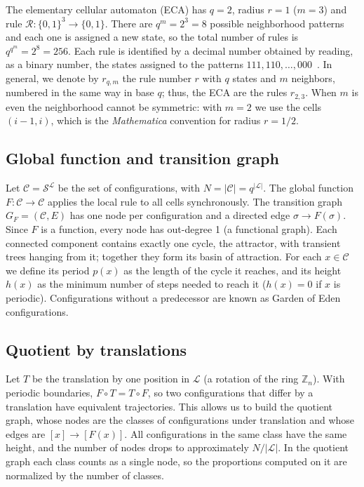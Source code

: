The elementary cellular automaton (ECA) has $q = 2$, radius $r = 1$ ($m = 3$) and rule $\mathcal{R} : \{0,1\}^3 \to \{0,1\}$. There are $q^{m} = 2^3 = 8$ possible neighborhood patterns and each one is assigned a new state, so the total number of rules is $q^{q^{m}} = 2^8 = 256$. Each rule is identified by a decimal number obtained by reading, as a binary number, the states assigned to the patterns $111, 110, \dots, 000$~\cite{Wolfram2002_nks}. In general, we denote by $r_{q,m}$ the rule number $r$ with $q$ states and $m$ neighbors, numbered in the same way in base $q$; thus, the ECA are the rules $r_{2,3}$. When $m$ is even the neighborhood cannot be symmetric: with $m = 2$ we use the cells $(i-1, i)$, which is the \textit{Mathematica} convention for radius $r = 1/2$.

\subsection{Global function and transition graph}

Let $\mathcal{C} = \mathcal{S}^{\mathcal{L}}$ be the set of configurations, with $N = |\mathcal{C}| = q^{|\mathcal{L}|}$. The global function $F : \mathcal{C} \to \mathcal{C}$ applies the local rule to all cells synchronously. The transition graph $G_F = (\mathcal{C}, E)$ has one node per configuration and a directed edge $\sigma \to F(\sigma)$. Since $F$ is a function, every node has out-degree 1 (a functional graph). Each connected component contains exactly one cycle, the attractor, with transient trees hanging from it; together they form its basin of attraction. For each $x \in \mathcal{C}$ we define its period $p(x)$ as the length of the cycle it reaches, and its height $h(x)$ as the minimum number of steps needed to reach it ($h(x) = 0$ if $x$ is periodic). Configurations without a predecessor are known as Garden of Eden configurations.

\subsection{Quotient by translations}
\label{subsec:quotient}

Let $T$ be the translation by one position in $\mathcal{L}$ (a rotation of the ring $\mathbb{Z}_n$). With periodic boundaries, $F \circ T = T \circ F$, so two configurations that differ by a translation have equivalent trajectories. This allows us to build the quotient graph, whose nodes are the classes of configurations under translation and whose edges are $[x] \to [F(x)]$. All configurations in the same class have the same height, and the number of nodes drops to approximately $N/|\mathcal{L}|$. In the quotient graph each class counts as a single node, so the proportions computed on it are normalized by the number of classes.
